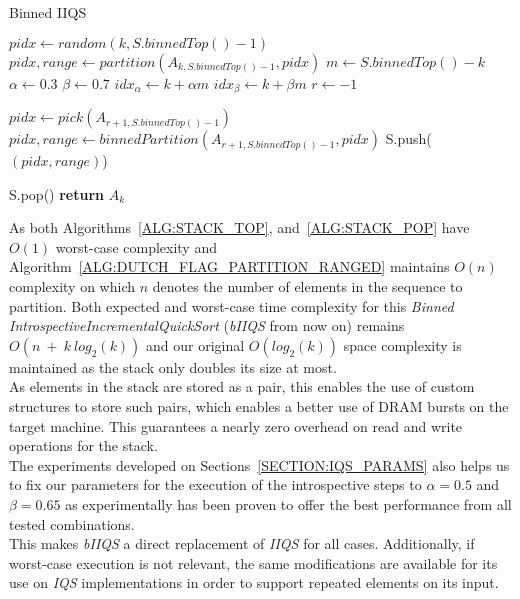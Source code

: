 \begin{algorithm}
  \begin{algorithmic}[1]
    \caption{Binned IIQS} \label{ALG:RANGED_IIQS}
        \State $pidx \gets random(k,S.binnedTop()-1)$
        \State $pidx, range \gets partition(A_{k,S.binnedTop()-1}, pidx)$
        \State $m \gets S.binnedTop() - k$
        \State $\alpha \gets 0.3$
        \State $\beta \gets 0.7$
        \State $idx_\alpha \gets k + \alpha m$
        \State $idx_\beta \gets k + \beta m$
        \State $r \gets -1$

            \State $pidx \gets pick(A_{r+1,S.binnedTop()-1})$
            \State $pidx, range \gets binnedPartition(A_{r+1,S.binnedTop()-1},pidx)$
        \EndIf
        \State S.push($(pidx, range)$)

    \EndWhile
    \State S.pop()
    \State \textbf{return} $A_{k}$\label{RANGED_IIQS}
    \EndProcedure
  \end{algorithmic}
\end{algorithm}

As both Algorithms~\ref{ALG:STACK_TOP}, and~\ref{ALG:STACK_POP} have $O(1)$ worst-case complexity and Algorithm~\ref{ALG:DUTCH_FLAG_PARTITION_RANGED} maintains $O(n)$ complexity on which $n$ denotes the number of elements in the sequence to partition. Both expected and worst-case time complexity for this \emph{Binned IntrospectiveIncrementalQuickSort} (\emph{bIIQS} from now on) remains $O(n~+~k~log_2(k))$ and our original $O(log_2(k))$ space complexity is maintained as the stack only doubles its size at most.\\

As elements in the stack are stored as a pair, this enables the use of custom structures to store such pairs, which enables a better use of DRAM bursts on the target machine. This guarantees a nearly zero overhead on read and write operations for the stack.\\

The experiments developed on Sections~\ref{SECTION:IQS_PARAMS} also helps us to fix our parameters for the execution of the introspective steps to $\alpha=0.5$ and $\beta=0.65$ as experimentally has been proven to offer the best performance from all tested combinations.\\

This makes \emph{bIIQS} a direct replacement of \emph{IIQS} for all cases. Additionally, if worst-case execution is not relevant, the same modifications are available for its use on \emph{IQS} implementations in order to support repeated elements on its input.\\

